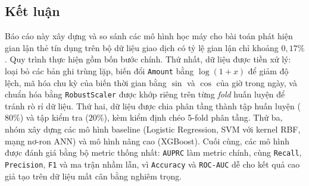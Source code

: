 \subsection{Kết luận}\label{subsec:ket-luan}

Báo cáo này xây dựng và so sánh các mô hình học máy cho bài toán phát hiện gian lận thẻ tín dụng trên bộ dữ liệu giao dịch có tỷ lệ gian lận chỉ khoảng $0{,}17\%$. Quy trình thực hiện gồm bốn bước chính. Thứ nhất, dữ liệu được tiền xử lý: loại bỏ các bản ghi trùng lặp, biến đổi \texttt{Amount} bằng $\log(1+x)$ để giảm độ lệch, mã hóa chu kỳ của biến thời gian bằng $\sin$ và $\cos$ của giờ trong ngày, và chuẩn hóa bằng \texttt{RobustScaler} được khớp riêng trên từng \textit{fold} huấn luyện để tránh rò rỉ dữ liệu. Thứ hai, dữ liệu được chia phân tầng thành tập huấn luyện ($80\%$) và tập kiểm tra ($20\%$), kèm kiểm định chéo 5-fold phân tầng. Thứ ba, nhóm xây dựng các mô hình baseline (Logistic Regression, SVM với kernel RBF, mạng nơ-ron ANN) và mô hình nâng cao (XGBoost). Cuối cùng, các mô hình được đánh giá bằng bộ metric thống nhất: \texttt{AUPRC} làm metric chính, cùng \texttt{Recall}, \texttt{Precision}, \texttt{F1} và ma trận nhầm lẫn, vì \texttt{Accuracy} và \texttt{ROC-AUC} dễ cho kết quả cao giả tạo trên dữ liệu mất cân bằng nghiêm trọng.

